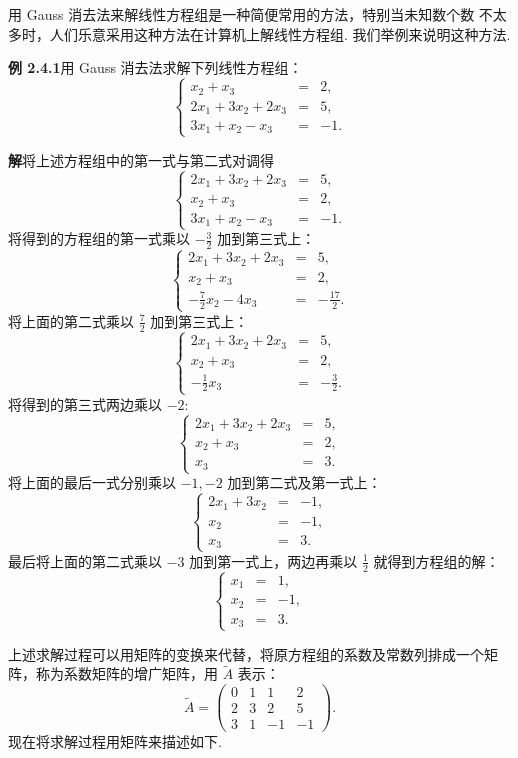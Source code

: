 \documentclass[UTF8, 12pt, fontset=fandol, oneside]{ctexart}
\begin{document}
用 Gauss 消去法来解线性方程组是一种简便常用的方法，特别当未知数个数
不太多时，人们乐意采用这种方法在计算机上解线性方程组. 我们举例来说明这种方法.

\noindent\textbf{例 2.4.1}\quad 用 Gauss 消去法求解下列线性方程组：
\[
\left\{\begin{array}{rcl}
x_2+x_3&=&2,\\
2x_1+3x_2+2x_3&=&5,\\
3x_1+x_2-x_3&=&-1.
\end{array}\right.
\]

\noindent\textbf{解}\quad 将上述方程组中的第一式与第二式对调得
\[
\left\{\begin{array}{rcl}
2x_1+3x_2+2x_3&=&5,\\
x_2+x_3&=&2,\\
3x_1+x_2-x_3&=&-1.
\end{array}\right.
\]
将得到的方程组的第一式乘以 $-\frac{3}{2}$ 加到第三式上：
\[
\left\{\begin{array}{rcl}
2x_1+3x_2+2x_3&=&5,\\
x_2+x_3&=&2,\\
-\frac{7}{2}x_2-4x_3&=&-\frac{17}{2}.
\end{array}\right.
\]
将上面的第二式乘以 $\frac{7}{2}$ 加到第三式上：
\[
\left\{\begin{array}{rcl}
2x_1+3x_2+2x_3&=&5,\\
x_2+x_3&=&2,\\
-\frac{1}{2}x_3&=&-\frac{3}{2}.
\end{array}\right.
\]
将得到的第三式两边乘以 $-2$:
\[
\left\{\begin{array}{rcl}
2x_1+3x_2+2x_3&=&5,\\
x_2+x_3&=&2,\\
x_3&=&3.
\end{array}\right.
\]
将上面的最后一式分别乘以 $-1,-2$ 加到第二式及第一式上：
\[
\left\{\begin{array}{rcl}
2x_1+3x_2&=&-1,\\
x_2&=&-1,\\
x_3&=&3.
\end{array}\right.
\]
最后将上面的第二式乘以 $-3$ 加到第一式上，两边再乘以 $\frac{1}{2}$ 就得到方程组的解：
\[
\left\{\begin{array}{rcl}
x_1&=&1,\\
x_2&=&-1,\\
x_3&=&3.
\end{array}\right.
\]

上述求解过程可以用矩阵的变换来代替，将原方程组的系数及常数列排成一个矩阵，称为系数矩阵的增广矩阵，用 $\widetilde{A}$ 表示：
\[
\widetilde{A}=
\left(\begin{array}{cccc}
0 & 1 & 1 & 2\\
2 & 3 & 2 & 5\\
3 & 1 & -1 & -1
\end{array}\right).
\]
现在将求解过程用矩阵来描述如下.
\end{document}

